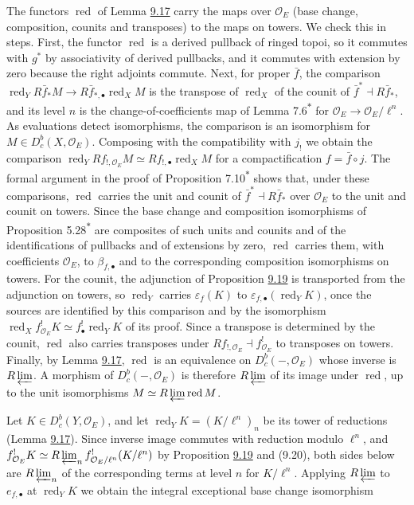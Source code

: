 \documentclass[11pt]{article}
\newcommand{\bpout}[1]{#1\textsuperscript{\hyperlink{bp-outside}{\ensuremath{\ast}}}}
\providecommand{\Dbc}{}\renewcommand{\Dbc}{D^b_c}
\begin{document}
The functors \(\operatorname{red}\) of Lemma \hyperref[bp57]{9.17} carry the maps over \(\mathcal O_E\) (base change, composition, counits and transposes) to the maps on towers. We check this in steps. First, the functor \(\operatorname{red}\) is a derived pullback of ringed topoi, so it commutes with \(g^*\) by associativity of derived pullbacks, and it commutes with extension by zero because the right adjoints commute. Next, for proper \(\bar f\), the comparison \(\operatorname{red}_YR\bar f_*M\to R\bar f_{*,\bullet}\operatorname{red}_XM\) is the transpose of \(\operatorname{red}_X\) of the counit of \(\bar f^*\dashv R\bar f_*\), and its level \(n\) is the change-of-coefficients map of Lemma \bpout{7.6} for \(\mathcal O_E\to\mathcal O_E/\ell^n\). As evaluations detect isomorphisms, the comparison is an isomorphism for \(M\in\Dbc(X,\mathcal O_E)\). Composing with the compatibility with \(j_!\) we obtain the comparison \(\operatorname{red}_YRf_{!,\mathcal O_E}M\simeq Rf_{!,\bullet}\operatorname{red}_XM\) for a compactification \(f=\bar f\circ j\). The formal argument in the proof of Proposition \bpout{7.10} shows that, under these comparisons, \(\operatorname{red}\) carries the unit and counit of \(\bar f^*\dashv R\bar f_*\) over \(\mathcal O_E\) to the unit and counit on towers. Since the base change and composition isomorphisms of Proposition \bpout{5.28} are composites of such units and counits and of the identifications of pullbacks and of extensions by zero, \(\operatorname{red}\) carries them, with coefficients \(\mathcal O_E\), to \(\beta_{f,\bullet}\) and to the corresponding composition isomorphisms on towers. For the counit, the adjunction of Proposition \hyperref[bp63]{9.19} is transported from the adjunction on towers, so \(\operatorname{red}_Y\) carries \(\varepsilon_f(K)\) to \(\varepsilon_{f,\bullet}(\operatorname{red}_YK)\), once the sources are identified by this comparison and by the isomorphism \(\operatorname{red}_Xf^!_{\mathcal O_E}K\simeq f^!_\bullet\operatorname{red}_YK\) of its proof. Since a transpose is determined by the counit, \(\operatorname{red}\) also carries transposes under \(Rf_{!,\mathcal O_E}\dashv f^!_{\mathcal O_E}\) to transposes on towers. Finally, by Lemma \hyperref[bp57]{9.17}, \(\operatorname{red}\) is an equivalence on \(\Dbc(-,\mathcal O_E)\) whose inverse is \(R\varprojlim\). A morphism of \(\Dbc(-,\mathcal O_E)\) is therefore \(R\varprojlim\) of its image under \(\operatorname{red}\), up to the unit isomorphisms \(M\simeq R\varprojlim\operatorname{red}M\).

Let \(K\in\Dbc(Y,\mathcal O_E)\), and let \(\operatorname{red}_YK=(K/\ell^n)_n\) be its tower of reductions (Lemma \hyperref[bp57]{9.17}). Since inverse image commutes with reduction modulo \(\ell^n\), and \(f_{\mathcal O_E}^!K\simeq R\varprojlim_nf_{\mathcal O_E/\ell^n}^!(K/\ell^n)\) by Proposition \hyperref[bp63]{9.19} and (9.20), both sides below are \(R\varprojlim_n\) of the corresponding terms at level \(n\) for \(K/\ell^n\). Applying \(R\varprojlim\) to \(e_{f,\bullet}\) at \(\operatorname{red}_YK\) we obtain the integral exceptional base change isomorphism
\end{document}

